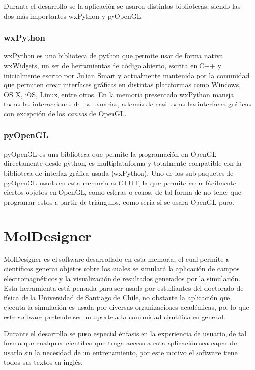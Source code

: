 Durante el desarrollo se la aplicación se usaron distintas bibliotecas, siendo las dos más importantes wxPython y pyOpenGL.

\subsubsection{wxPython}

wxPython es una biblioteca de python que permite usar de forma nativa wxWidgets, un set de herramientas de código abierto, escrita en C++ y inicialmente escrito por Julian Smart y actualmente mantenida por la comunidad que permiten crear interfaces gráficas en distintas plataformas como Windows, OS X, iOS, Linux, entre otros. En la memoria presentado wxPython maneja todas las interacciones de los usuarios, además de casi todas las interfaces gráficas con excepción de los \emph{canvas} de OpenGL.

\subsubsection{pyOpenGL}

pyOpenGL es una biblioteca que permite la programación en OpenGL directamente desde python, es multiplataforma y totalmente compatible con la biblioteca de interfaz gráfica usada (wxPython). Uno de los sub-paquetes de pyOpenGL usado en esta memoria es GLUT, la que permite crear fácilmente ciertos objetos en OpenGL, como esferas o conos, de tal forma de no tener que programar estos a partir de triángulos, como sería si se usara OpenGL puro.

\section{MolDesigner}

MolDesigner es el software desarrollado en esta memoria, el cual permite a científicos generar objetos sobre los cuales se simulará la aplicación de campos electromagnéticos y la visualización de resultados generados por la simulación. Esta herramienta está pensada para ser usada por estudiantes del doctorado de física de la Universidad de Santiago de Chile, no obstante la aplicación que ejecuta la simulación es usada por diversas organizaciones académicas, por lo que este software pretende ser un aporte a la comunidad científica en general.

Durante el desarrollo se puso especial énfasis en la experiencia de usuario, de tal forma que cualquier científico que tenga acceso a esta aplicación sea capaz de usarlo sin la necesidad de un entrenamiento, por este motivo el software tiene todos sus textos en inglés.

